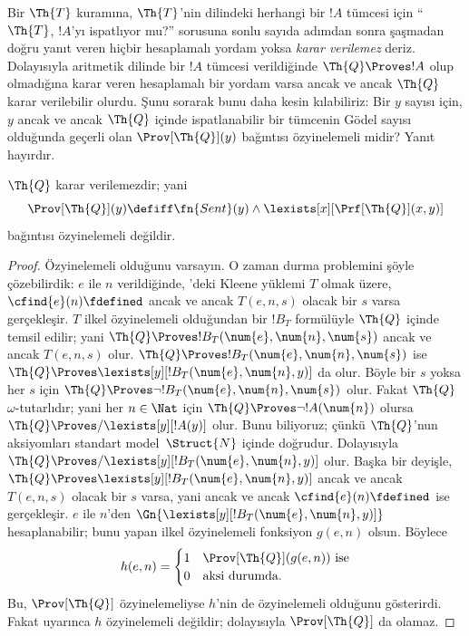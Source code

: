 \documentclass[../../../include/open-logic-section]{subfiles}
\begin{document}

Bir $\Th{T}$ kuramına, $\Th{T}$'nin dilindeki herhangi bir $!A$ tümcesi
için ``$\Th{T}$, $!A$'yı ispatlıyor mu?'' sorusuna sonlu sayıda adımdan
sonra şaşmadan doğru yanıt veren hiçbir hesaplamalı yordam yoksa
\emph{karar verilemez} deriz. Dolayısıyla aritmetik dilinde bir $!A$ tümcesi
verildiğinde $\Th{Q} \Proves !A$ olup olmadığına karar veren hesaplamalı
bir yordam varsa ancak ve ancak $\Th{Q}$ karar verilebilir olurdu. Şunu
sorarak bunu daha kesin kılabiliriz: Bir $y$ sayısı için, $y$ ancak ve ancak $\Th{Q}$ içinde
ispatlanabilir bir tümcenin Gödel sayısı olduğunda geçerli olan
$\Prov[\Th{Q}](y)$ bağıntısı özyinelemeli midir? Yanıt hayırdır.

\begin{thm}
$\Th{Q}$ karar verilemezdir; yani
\[
\Prov[\Th{Q}](y) \defiff \fn{Sent}(y) \land
\lexists[x][\Prf[\Th{Q}](x, y)]
\]
bağıntısı özyinelemeli değildir.
\end{thm}

\begin{proof}
Özyinelemeli olduğunu varsayın. O zaman durma problemini şöyle çözebilirdik:
$e$ ile $n$ verildiğinde, 'deki Kleene
yüklemi $T$ olmak üzere, $\cfind{e}(n)\fdefined$ ancak ve ancak
$T(e,n,s)$ olacak bir $s$ varsa gerçekleşir. $T$ ilkel özyinelemeli
olduğundan bir $!B_T$ formülüyle $\Th{Q}$ içinde temsil edilir; yani
$\Th{Q} \Proves !B_T(\num{e},\num{n},\num{s})$ ancak ve ancak $T(e,n,s)$
olur. $\Th{Q} \Proves !B_T(\num{e},\num{n},\num{s})$ ise
$\Th{Q} \Proves \lexists[y][!B_T(\num{e},\num{n},y)]$ da olur. Böyle bir
$s$ yoksa her $s$ için
$\Th{Q} \Proves \lnot !B_T(\num{e},\num{n},\num{s})$ olur. Fakat $\Th{Q}$
$\omega$-tutarlıdır; yani her $n\in\Nat$ için
$\Th{Q} \Proves \lnot !A(\num{n})$ olursa
$\Th{Q} \Proves/ \lexists[y][!A(y)]$ olur. Bunu biliyoruz; çünkü
$\Th{Q}$'nun aksiyomları standart model~$\Struct{N}$ içinde doğrudur.
Dolayısıyla $\Th{Q} \Proves/
\lexists[y][!B_T(\num{e},\num{n},y)]$ olur. Başka bir deyişle,
$\Th{Q} \Proves \lexists[y][!B_T(\num{e},\num{n},y)]$ ancak ve ancak
$T(e,n,s)$ olacak bir $s$ varsa, yani ancak ve ancak
$\cfind{e}(n)\fdefined$ ise gerçekleşir. $e$ ile $n$'den
$\Gn{\lexists[y][!B_T(\num{e},
    \num{n}, y)]}$ hesaplanabilir; bunu yapan ilkel özyinelemeli fonksiyon
$g(e,n)$ olsun. Böylece
\[
h(e, n) =
\begin{cases}
1 & \text{$\Prov[\Th{Q}](g(e, n))$ ise}\\
0 & \text{aksi durumda}.
\end{cases}
\]
Bu, $\Prov[\Th{Q}]$ özyinelemeliyse $h$'nin de özyinelemeli olduğunu
gösterirdi. Fakat  uyarınca $h$
özyinelemeli değildir; dolayısıyla $\Prov[\Th{Q}]$ da olamaz.
\end{proof}
\end{document}
